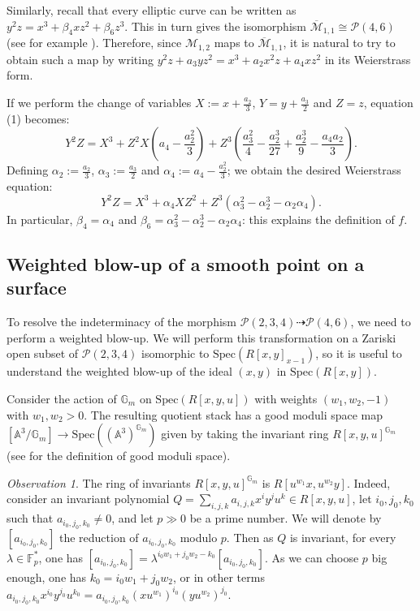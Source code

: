 \documentclass[11pt]{amsart}
\theoremstyle{definition}
\theoremstyle{remark}
\newtheorem{observation}{Observation}
\newcommand{\calM}{\mathcal M}
\newcommand{\calP}{\mathcal P}
\newcommand{\bG}{\mathbb{G}}
\newcommand{\Spec}{\mathrm{Spec}}
\begin{document}
Similarly, recall that every elliptic curve can be written as $y^2z = x^3 + \beta_4xz^2 + \beta_6z^3$. This in turn gives the isomorphism $\overline{\calM}_{1,1}\cong \calP(4,6)$ (see for example \cite[Remark at page 627]{EG98}). Therefore, since $\calM_{1,2}$ maps to $\overline{\calM}_{1,1}$, it is natural to
try to obtain such a map by writing $y^2z + a_3yz^2 = x^3 + a_2x^2z + a_4xz^2$ in its Weierstrass form.   


 If we perform the change of variables $X:= x + \frac{a_2}{3}$, $Y = y + \frac{a_3}{2}$ and $Z=z$, equation (1) becomes:
$$Y^2Z = X^3 + Z^2X\left(a_4 - \frac{a_2^2}{3}\right) + Z^3\left(\frac{a_3^2}{4} - \frac{a_2^3}{27} + \frac{a_2^3}{9} - \frac{a_4a_2}{3}\right).$$
Defining $\alpha_2 := \frac{a_2}{3}$, $\alpha_3 := \frac{a_3}{2}$ and $\alpha_4:=a_4 - \frac{a_2^2}{3}$; we obtain the desired Weierstrass equation:
$$Y^2Z = X^3 + \alpha_4XZ^2 + Z^3(\alpha_3^2 - \alpha_2^3 -\alpha_2\alpha_4).$$
In particular, $\beta_4 = \alpha_4$ and $\beta_6 = \alpha_3^2 - \alpha_2^3 -\alpha_2\alpha_4$: this explains the definition of $f$.


\subsection{Weighted blow-up of a smooth point on a surface}\label{subsection:weighted:blowup} 

To resolve the indeterminacy of the morphism $\calP(2,3,4)\dashrightarrow \calP(4,6)$, we need to perform a weighted blow-up. We will perform this transformation on a Zariski open subset of $\calP(2,3,4)$ isomorphic to $\Spec(R[x,y]_{x-1})$, so it is useful to understand the weighted blow-up of the ideal $(x,y)$ in $\Spec(R[x,y])$.

Consider the action of $\bG_m$ on $\Spec(R[x,y,u])$ with weights $(w_1,w_2,-1)$ with $w_1, w_2>0$. The resulting quotient stack has a good moduli space map $[\mathbb{A}^3/\bG_m]\to \Spec((\mathbb{A}^3)^{\bG_m})$
given by taking the invariant ring $R[x,y,u]^{\bG_m}$ (see \cite[Definition 4.1]{GMS_jarod} for the definition of good moduli space).
\begin{observation}
The ring of invariants $R[x,y,u]^{\bG_m}$ is $R[u^{w_1}x,u^{w_2}y]$. Indeed, consider an invariant polynomial $Q = \sum_{i,j,k}a_{i,j,k}x^iy^ju^k\in R[x,y,u]$, let $i_0,j_0,k_0$ such that $a_{i_0,j_0,k_0}\neq 0$, and let $p\gg 0$ be a prime number. We will denote by $[a_{i_0,j_0,k_0}]$ the reduction of $a_{i_0,j_0,k_0}$ modulo $p$. Then as $Q$ is invariant, for every $\lambda \in \mathbb{F}_p^*$, one has $[a_{i_0,j_0,k_0}] = \lambda^{i_0w_1 + j_0w_2 - k_0} [a_{i_0,j_0,k_0}]$. As we can choose $p$ big enough, one has $k_0=i_0w_1 + j_0w_2$, or in other terms $a_{i_0,j_0,k_0}x^{i_0}y^{j_0}u^{k_0} = a_{i_0,j_0,k_0}(xu^{w_1})^{i_0}(yu^{w_2})^{j_0}$.
\end{observation}
\end{document}
